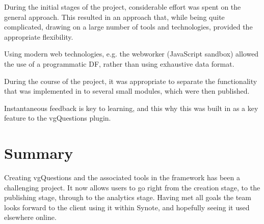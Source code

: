 
During the initial stages of the project, considerable effort was spent on the general approach. This resulted in an approach that, while being quite complicated, drawing on a large number of tools and technologies, provided the appropriate flexibility.

Using modern web technologies, e.g. the \gls{webworker} (JavaScript sandbox) allowed the use of a programmatic \gls{DF}, rather than using exhaustive data format.

During the course of the project, it was appropriate to separate the functionality that was implemented in to several small modules, which were then published.

Instantaneous feedback is key to learning, and this why this was built in as a key feature to the \gls{vgQuestions} plugin.

\section{Summary}

Creating \gls{vgQuestions} and the associated tools in the framework has been a challenging project. It now allows users to go right from the creation stage, to the publishing stage, through to the analytics stage. Having met all goals the team looks forward to the client using it within Synote, and hopefully seeing it used elsewhere online.


